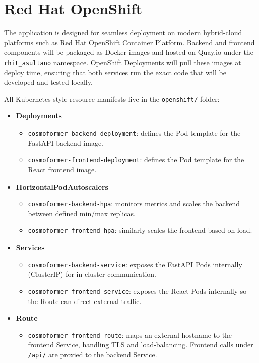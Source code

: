 \section*{Red Hat OpenShift}

The application is designed for seamless deployment on modern hybrid-cloud platforms such as Red Hat OpenShift Container Platform. Backend and frontend components will be packaged as Docker images and hosted on Quay.io under the \texttt{rhit\_asultano} namespace. OpenShift Deployments will pull these images at deploy time, ensuring that both services run the exact code that will be developed and tested locally.

All Kubernetes-style resource manifests live in the \texttt{openshift/} folder:

\begin{itemize}
  \item \textbf{Deployments}
    \begin{itemize}
      \item \texttt{cosmoformer-backend-deployment}: defines the Pod template for the FastAPI backend image.
      \item \texttt{cosmoformer-frontend-deployment}: defines the Pod template for the React frontend image.
    \end{itemize}

  \item \textbf{HorizontalPodAutoscalers}
    \begin{itemize}
      \item \texttt{cosmoformer-backend-hpa}: monitors metrics and scales the backend between defined min/max replicas.
      \item \texttt{cosmoformer-frontend-hpa}: similarly scales the frontend based on load.
    \end{itemize}

  \item \textbf{Services}
    \begin{itemize}
      \item \texttt{cosmoformer-backend-service}: exposes the FastAPI Pods internally (ClusterIP) for in-cluster communication.
      \item \texttt{cosmoformer-frontend-service}: exposes the React Pods internally so the Route can direct external traffic.
    \end{itemize}

  \item \textbf{Route}
    \begin{itemize}
      \item \texttt{cosmoformer-frontend-route}: maps an external hostname to the frontend Service, handling TLS and load-balancing. Frontend calls under \texttt{/api/} are proxied to the backend Service.
    \end{itemize}


\end{itemize}

